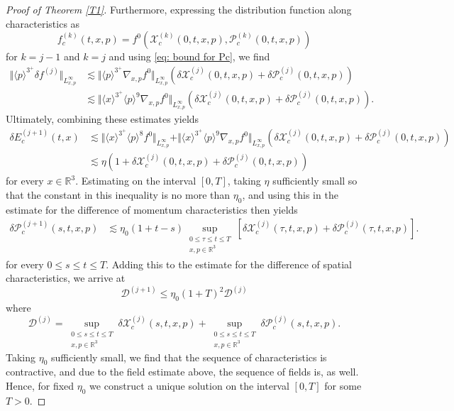 \documentclass[reqno, 11pt, letterpaper]{amsart}
\theoremstyle{remark}
\newcommand{\mcD}{\mathcal{D}}
\numberwithin{equation}{section}
\numberwithin{theorem}{section}
\numberwithin{table}{section}
\numberwithin{figure}{section}
\begin{document}
\begin{proof}[Proof of Theorem \ref{T1}]
Furthermore, expressing the distribution function along characteristics as 
$$f_c^{(k)}(t,x,p) = f^0 \left ( \mathcal{X}_c^{(k)}(0,t,x,p), \mathcal{P}_c^{(k)}(0,t,x,p) \right ) $$
for $k = j-1$ and $k= j$
and using \eqref{eq: bound for Pc}, we find
$$\begin{aligned}
\Vert \langle p \rangle^{3^+} \delta f^{(j)} \Vert_{L^\infty_{x,p}}
& \lesssim \Vert \langle p \rangle^{3^+} \nabla_{x,p} f^0\Vert_{L^\infty_{x,p}}
\left (\delta\mathcal{X}_c^{(j)}(0,t,x,p) + \delta\mathcal{P}_c^{(j)}(0,t,x,p) \right )\\
& \lesssim \Vert \langle x \rangle^{3^+} \langle p \rangle^9 \nabla_{x,p} f^0\Vert_{L^\infty_{x,p}}
\left (\delta\mathcal{X}_c^{(j)}(0,t,x,p) + \delta\mathcal{P}_c^{(j)}(0,t,x,p) \right ).
\end{aligned}$$
Ultimately, combining these estimates yields
$$\begin{aligned}
\delta E_c^{(j+1)}(t, x) & \lesssim 
\Vert \langle x \rangle^{3^+} \langle p \rangle^8 f^0 \Vert_{L^\infty_{x,p}} +
\Vert \langle x \rangle^{3^+} \langle p \rangle^9 \nabla_{x,p} f^0\Vert_{L^\infty_{x,p}}
\left ( \delta \mathcal{X}_c^{(j)}(0,t,x,p) + \delta \mathcal{P}_c^{(j)}(0,t,x,p) \right )\\
& \lesssim \eta \left ( 1+ \delta \mathcal{X}_c^{(j)}(0,t,x,p) + \delta \mathcal{P}_c^{(j)}(0,t,x,p)\right )
\end{aligned}$$
for every $x \in \mathbb{R}^3$.
Estimating on the interval $[0,T]$, taking $\eta$ sufficiently small so that the constant in this inequality is no more than $\eta_0$, and using this in the estimate for the difference of momentum characteristics then yields
$$\begin{aligned}
\delta \mathcal{P}_c^{(j+1)}(s,t,x,p)
& \lesssim \eta_0(1+t-s) \sup_{\substack{0 \leq \tau \leq t \leq T \\x,p \in \mathbb{R}^3 }} \left [ \delta \mathcal{X}_c^{(j)}(\tau,t,x,p) + \delta \mathcal{P}_c^{(j)}(\tau,t,x,p) \right ].
\end{aligned}$$
for every $0\leq s \leq t \leq T$.
Adding this to the estimate for the difference of spatial characteristics, we arrive at 
$$\mcD^{(j+1)} \leq \eta_0(1+T)^2 \mcD^{(j)}$$
where
$$\mcD^{(j)} = \sup_{\substack{0 \leq s \leq t \leq T \\x,p \in \mathbb{R}^3 }} \delta \mathcal{X}_c^{(j)}(s,t,x,p)  +  \sup_{\substack{0 \leq s \leq t \leq T \\x,p \in \mathbb{R}^3 }} \delta \mathcal{P}_c^{(j)}(s,t,x,p).
$$
Taking $\eta_0$ sufficiently small, we find that the sequence of characteristics is contractive, and due to the field estimate above, the sequence of fields is, as well.
Hence, for fixed $\eta_0$ we construct a unique solution on the interval $[0,T]$ for some $T > 0$.


\end{proof}
\end{document}
